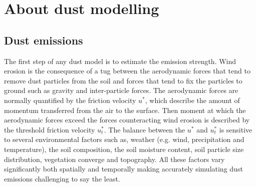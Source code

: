 
\section{About dust modelling}\label{sec:dust_modelling}

\subsection{Dust emissions}\label{sec:dust_emission_modelling}
The first step of any dust model is to estimate the emission strength. Wind erosion is the consequence of a tug between the aerodynamic forces that tend to remove dust particles from the soil and forces that tend to fix the particles to ground such as gravity and inter-particle forces. The aerodynamic forces are normally quantified by the friction velocity $u^*$, which describe the amount of momentum transferred from the air to the surface. Then moment at which the aerodynamic forces exceed the forces counteracting wind erosion is described by the threshold friction velocity $u^*_t$. The balance between the $u^*$ and $u^*_t$ is sensitive to several environmental factors such as, weather (e.g. wind, precipitation and temperature), the soil composition, the soil moisture content, soil particle size distribution, vegetation converge and topography. All these factors vary significantly both spatially and temporally making accurately simulating dust emissions challenging to say the least.       

